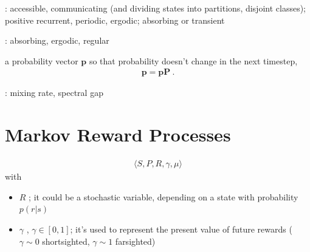 \documentclass[letterpaper,10pt,english]{jupyterBook}
\begin{document}
\sphinxAtStartPar
{}: accessible, communicating (and dividing states into partitions, disjoint classes); positive recurrent, periodic, ergodic; absorbing or transient

\sphinxAtStartPar
{}: absorbing, ergodic, regular

\sphinxAtStartPar
{} a probability vector \(\mathbf{p}\) so that probability doesn’t change in the next timestep,
\begin{equation*}
\begin{split}\mathbf{p} = \mathbf{p} \mathbf{P} \ .\end{split}
\end{equation*}
\sphinxAtStartPar
{}

\sphinxAtStartPar
{}: mixing rate, spectral gap


\section{Markov Reward Processes}
\label{\detokenize{ch/rl/mdp:markov-reward-processes}}\begin{equation*}
\begin{split}\langle S, P, R, \gamma, \mu \rangle\end{split}
\end{equation*}
\sphinxAtStartPar
with
\begin{itemize}
\item {} 
\sphinxAtStartPar
\(R\) ; it could be a stochastic variable, depending on a state with probability \(p(r|s)\) 

\item {} 
\sphinxAtStartPar
\(\gamma\) , \(\gamma \in [0,1]\); it’s used to represent the present value of future rewards (\(\gamma \sim 0\) short\sphinxhyphen{}sighted, \(\gamma \sim 1\) far\sphinxhyphen{}sighted)

\end{itemize}
\end{document}
